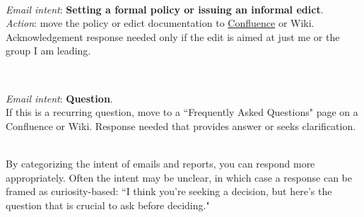 \ \\
\begin{samepage}
\textit{Email intent}: \textbf{Setting a formal policy or issuing an informal edict}.\\
\textit{Action}: move the policy or edict documentation to \href{https://en.wikipedia.org/wiki/Confluence_(software)}{Confluence}
or Wiki.\iftoggle{WPinmargin}{\marginpar{[Wikipedia] Confluence}}{}
Acknowledgement response needed only if the edit is aimed at just me or the group I am leading.
\end{samepage}

\ \\
\begin{samepage}
\textit{Email intent}: \textbf{Question}.\\
If this is a recurring question, move to a ``Frequently Asked Questions" page on a Confluence or Wiki.
Response needed that provides answer or seeks clarification.
\end{samepage}

\ \\

By categorizing the intent of emails and reports, you can respond more appropriately. Often the intent may be unclear, in which case a response can be framed as curiosity-based: ``I think you're seeking a decision, but here's the question that is crucial to ask before deciding."

\ \\

